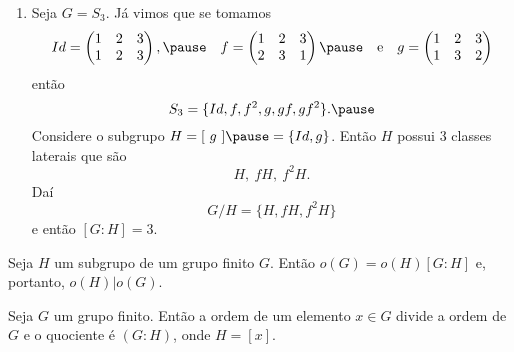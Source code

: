 \documentclass{beamer}
\begin{document}
    \begin{frame}
        \begin{exemplos}
            \begin{enumerate}[label=({\arabic*})]
                \conti

                \item Seja $G = S_3$. \pause J\'a vimos que se tomamos
                \[
                    Id = \begin{pmatrix}
                        1 & 2 & 3\\
                        1 & 2 & 3
                    \end{pmatrix}, \pause\quad
                    f = \begin{pmatrix}
                        1 & 2 & 3\\
                        2 & 3 & 1
                    \end{pmatrix} \pause \quad \mbox{e}\quad
                    g = \begin{pmatrix}
                        1 & 2 & 3\\
                        1 & 3 & 2
                    \end{pmatrix}
                \]
                ent\~ao
                \[
                    S_3 = \{Id, f, f^2, g, gf, gf^2\}. \pause
                \]
                Considere o subgrupo $H = [\ g\ ] \pause = \{Id, g\}$. Então $H$ possui 3 classes laterais que são
                \[
                    H,\ fH,\ f^2H. 
                \]
                Daí
                \[
                    G/H = \{H, fH, f^2H\}
                \]
                e então $[G : H] = 3$.
            \end{enumerate}
        \end{exemplos}
    \end{frame}

    \begin{frame}
        \begin{teorema}
            Seja $H$ um subgrupo de um grupo finito $G$. Então $o(G) = o(H)[G:H]$ e, portanto, $o(H) | o(G)$.
        \end{teorema}
    \end{frame}

    \begin{frame}
        \begin{corolario}
            Seja $G$ um grupo finito. Então a ordem de um elemento $x \in G$ divide a ordem de $G$ e o quociente é $(G : H)$, onde $H = [x]$.
        \end{corolario}
    \end{frame}
\end{document}
